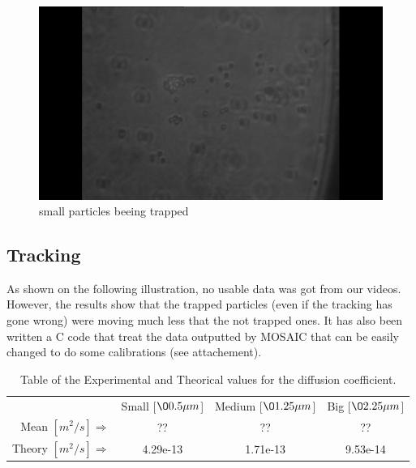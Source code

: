 \documentclass[a4paper,12pt,twoside]{article}	%
\begin{document}
\begin{figure}
	\begin{center}
	\includegraphics[width=0.7\linewidth,angle=0]{./figures/petit_trap}
	\caption{small particles beeing trapped} \label{fig:gros_trap}
	\end{center}
\end{figure}


\subsection{Tracking}

As shown on the following illustration, no usable data was got from our videos. However, the results show that the trapped particles (even if the tracking has gone wrong) were moving much less that the not trapped ones. It has also been written a C code that treat the data outputted by MOSAIC that can be easily changed to do some calibrations (see attachement).





\begin{table}
	\begin{tabular}{ r|c|c|c| }
		\multicolumn{1}{r}{} &  \multicolumn{1}{c}{Small [$\O 0.5\mu m$]} & 			\multicolumn{1}{c}{Medium [$\O 1.25\mu m$]} & 			\multicolumn{1}{c}{Big [$\O 2.25\mu m$]}\\

		\cline{2-4} Mean $[m^2/s] \Rightarrow$ & ?? & ?? & ??\\
		\cline{2-4} Theory $[m^2/s] \Rightarrow$ & 4.29e-13 & 1.71e-13 & 9.53e-14\\
		\cline{2-4}
	\end{tabular}
	\caption{Table of the Experimental and Theorical values for the diffusion coefficient.}
	\label{tab:diffusion}
\end{table}
\end{document}
